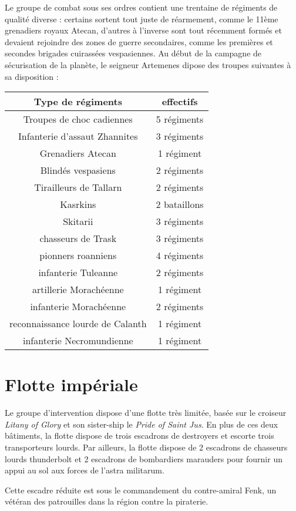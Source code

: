 \documentclass[10pt,a4paper]{book}
\begin{document}
Le groupe de combat sous ses ordres contient une trentaine de régiments de qualité diverse : certains sortent tout juste de réarmement, comme le 11ème grenadiers royaux Atecan, d'autres à l'inverse sont tout récemment formés et devaient rejoindre des zones de guerre secondaires, comme les premières et secondes brigades cuirassées vespasiennes. Au début de la campagne de sécurisation de la planète, le seigneur Artemenes dipose des troupes suivantes à sa disposition :
\begin{center}
\begin{tabular}{c|c}
Type de régiments & effectifs \\ \hline
Troupes de choc cadiennes & 5 régiments\\
Infanterie d'assaut Zhannites & 3 régiments\\ %
Grenadiers Atecan & 1 régiment \\
Blindés vespasiens & 2 régiments \\
Tirailleurs de Tallarn & 2 régiments \\ %
Kasrkins & 2 bataillons\\
Skitarii & 3 régiments \\
chasseurs de Trask & 3 régiments \\
pionners roanniens & 4 régiments \\%
infanterie Tuleanne  & 2 régiments\\
artillerie Morachéenne & 1 régiment\\
infanterie Morachéenne & 2 régiments \\
reconnaissance lourde de Calanth & 1 régiment\\
infanterie Necromundienne & 1 régiment
\end{tabular}
\end{center}

\section{Flotte impériale}
Le groupe d'intervention dispose d'une flotte très limitée, basée sur le croiseur \emph{Litany of Glory} et son sister-ship le \emph{Pride of Saint Jus}. En plus de ces deux bâtiments, la flotte dispose de trois escadrons de destroyers et escorte trois transporteurs lourds. Par ailleurs, la flotte dispose de 2 escadrons de chasseurs lourds thunderbolt et 2 escadrons de bombardiers marauders pour fournir un appui au sol aux forces de l'astra militarum.

Cette escadre réduite est sous le commandement du contre-amiral Fenk, un vétéran des patrouilles dans la région contre la piraterie.
\end{document}
